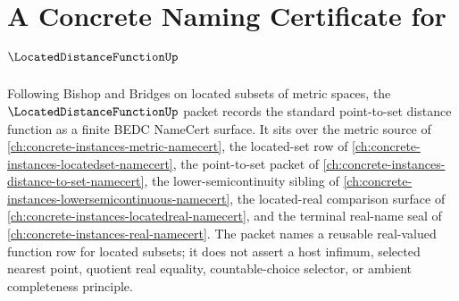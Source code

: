 \chapter{A Concrete Naming Certificate for $\LocatedDistanceFunctionUp$}
\label{ch:concrete-instances-located-distance-function-namecert}

Following Bishop and Bridges on located subsets of metric spaces, the $\LocatedDistanceFunctionUp$ packet records the standard point-to-set distance function as a finite BEDC NameCert surface. It sits over the metric source of \autoref{ch:concrete-instances-metric-namecert}, the located-set row of \autoref{ch:concrete-instances-locatedset-namecert}, the point-to-set packet of \autoref{ch:concrete-instances-distance-to-set-namecert}, the lower-semicontinuity sibling of \autoref{ch:concrete-instances-lowersemicontinuous-namecert}, the located-real comparison surface of \autoref{ch:concrete-instances-locatedreal-namecert}, and the terminal real-name seal of \autoref{ch:concrete-instances-real-namecert}. The packet names a reusable real-valued function row for located subsets; it does not assert a host infimum, selected nearest point, quotient real equality, countable-choice selector, or ambient completeness principle.

